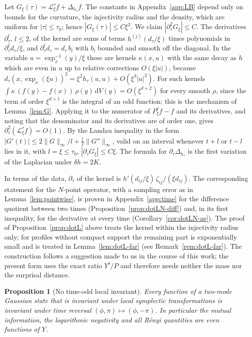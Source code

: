 \documentclass[11pt,a4paper]{article}
\makeatletter
\theoremstyle{stmt}
\newtheorem{proposition}[theorem]{Proposition}
\theoremstyle{defn}
\theoremstyle{rmk}
\renewenvironment{proof}[1][\proofname]{\par\pushQED{\qed}\normalfont\topsep6\p@\@plus6\p@\relax
  \trivlist\item[\hskip\labelsep{\sffamily\itshape\small #1.}]\ignorespaces}{\popQED\endtrivlist\@endpefalse}
\numberwithin{equation}{section}
\newcommand{\Lc}{\mathcal{L}}
\newcommand{\dd}{\mathrm{d}}
\makeatother
\begin{document}
\begin{proof}
Let $G_\xi(\tau)=\Lc^\tau_\xi f+\Delta_{h_\tau}f$. The constants in Appendix~\ref{app:LB} depend only on bounds for the curvature, the injectivity radius and the density, which are uniform for $|\tau|\le\tau_0$; hence $|G_\xi(\tau)|\le C\xi^2$. We claim $|\partial_\tau^2G_\xi|\le C$. The derivatives $\partial_\tau^l$, $l\le2$, of the kernel are sums of terms $h^{(j)}(d_\tau/\xi)$ times polynomials in $\partial_\tau^ld_\tau/\xi$, and $\partial_\tau^ld_\tau=d_\tau\,b_l$ with $b_l$ bounded and smooth off the diagonal. In the variable $u=\exp_x^{-1}(y)/\xi$ these are kernels $\kappa(x,u)$ with the same decay as $h$ which are even in $u$ up to relative corrections $O(\xi|u|)$, because $d_\tau(x,\exp_x(\xi u))^2=\xi^2h_\tau(u,u)+O(\xi^3|u|^3)$. For such kernels $\int\kappa\,(f(y)-f(x))\,\rho(y)\,\dd V(y)=O(\xi^{d+2})$ for every smooth $\rho$, since the term of order $\xi^{d+1}$ is the integral of an odd function; this is the mechanism of Lemma~\ref{lem:G}. Applying it to the numerator of $P^\tau_\xi f-f$ and its derivatives, and noting that the denominator and its derivatives are of order one, gives $\partial_\tau^2(\Lc^\tau_\xi f)=O(1)$. By the Landau inequality in the form $|G'(t)|\le2\|G\|_\infty/l+\tfrac l2\|G''\|_\infty$, valid on an interval whenever $t+l$ or $t-l$ lies in it, with $l=\xi\le\tau_0$, $|\partial_\tau G_\xi|\le C\xi$. The formula for $\partial_\tau\Delta_{h_\tau}$ is the first variation of the Laplacian under $\delta h=2K$.
\end{proof}

In terms of the data, $\partial_\tau$ of the kernel is $h'(d_{ij}/\xi)\,\zeta_{ij}/(\xi d_{ij})$. The corresponding statement for the $N$-point operator, with a sampling error as in Lemma~\ref{lem:pointwise}, is proven in Appendix~\ref{app:time} for the difference quotient between two times (Proposition~\ref{prop:dotLN-diff}) and, in its first inequality, for the derivative at every time (Corollary~\ref{cor:dotLN-ae}). The proof of Proposition~\ref{prop:dotL} above treats the kernel within the injectivity radius only; for profiles without compact support the remaining part is exponentially small and is treated in Lemma~\ref{lem:dotL-far} (see Remark~\ref{rem:dotL-far}). The construction follows a suggestion made to us in the course of this work; the present form uses the exact ratio $Y^{\mathrm s}/P$ and therefore needs neither the mass nor the surprisal distance.

\begin{proposition}[No time-odd local invariant]\label{prop:Todd}
Every function of a two-mode Gaussian state that is invariant under local symplectic transformations is invariant under time reversal $(\phi,\pi)\mapsto(\phi,-\pi)$. In particular the mutual information, the logarithmic negativity and all R\'enyi quantities are even functions of $Y$.
\end{proposition}
\end{document}
